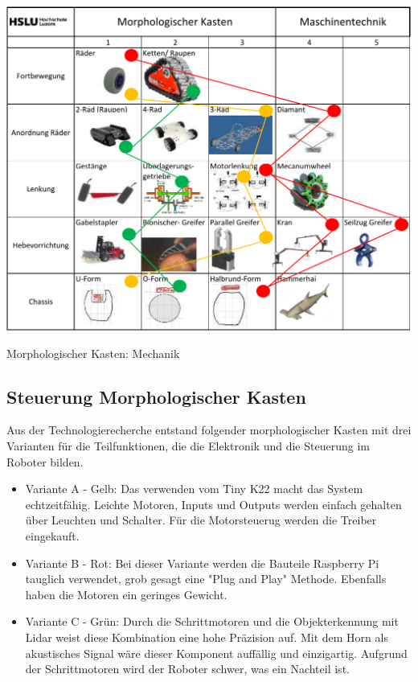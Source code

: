 \begin{table}[H]
\centering
\includegraphics[width=\textwidth]{assets/MK_Maschinentechnik.pdf}
\caption{Morphologischer Kasten: Mechanik}
\label{table:mk-mechanik}
\end{table}


\subsection{Steuerung Morphologischer Kasten}

Aus der Technologierecherche entstand folgender morphologischer Kasten mit drei Varianten für die Teilfunktionen, die die Elektronik und die Steuerung im Roboter bilden.

\begin{itemize}
    \item Variante A - Gelb: Das verwenden vom Tiny K22 macht das System echtzeitfähig. Leichte Motoren, Inputs und Outputs werden einfach gehalten über Leuchten und Schalter. Für die Motorsteuerug werden die Treiber eingekauft.
    \item Variante B - Rot: Bei dieser Variante werden die Bauteile Raspberry Pi tauglich verwendet, grob gesagt eine "Plug and Play" Methode. Ebenfalls haben die Motoren ein geringes Gewicht.
    \item Variante C - Grün: Durch die Schrittmotoren und die Objekterkennung mit Lidar weist diese Kombination eine hohe Präzision auf. Mit dem Horn als akustisches Signal wäre dieser Komponent auffällig und einzigartig. Aufgrund der Schrittmotoren wird der Roboter schwer, was ein Nachteil ist.
\end{itemize}

